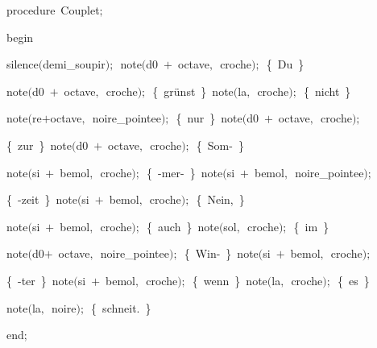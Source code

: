 {\pagebreak[3] 
\vspace{\neglskip}\mbox{\blc  \blk\idt  \mcl procedure\idt \ Couplet$;$}\par 
\vspace{\neglskip}\mbox{\blc  \blk\idt  \mcl begin\idt }\par 
\vspace{\neglskip}\mbox{\blc  \blk\blk\idt  silence$($demi\_soupir$)$$;$\ note$($d0\ $+$\ octave$,$\ croche$)$$;$\ \cmt  \{\ Du\ \}\idt }\par 
\vspace{\neglskip}\mbox{\blc  \blk\blk\idt  note$($d0\ $+$\ octave$,$\ croche$)$$;$\ \cmt  \{\ grünst\ \}\idt \ note$($la$,$\ croche$)$$;$\ \cmt  \{\ nicht\ \}\idt }\par 
\vspace{\neglskip}\mbox{\blc  \blk\blk\idt  note$($re$+$octave$,$\ noire\_pointee$)$$;$\ \cmt  \{\ nur\ \}\idt \ note$($d0\ $+$\ octave$,$\ croche$)$$;$\ }\par 
\vspace{\neglskip}\mbox{\blc  \blk\blk\idt  \cmt  \{\ zur\ \}\idt \ note$($d0\ $+$\ octave$,$\ croche$)$$;$\ \cmt  \{\ Som-\ \}\idt \ }\par 
\vspace{\neglskip}\mbox{\blc  \blk\blk\idt  note$($si\ $+$\ bemol$,$\ croche$)$$;$\ \cmt  \{\ -mer-\ \}\idt \ note$($si\ $+$\ bemol$,$\ noire\_pointee$)$$;$}\par 
\vspace{\neglskip}\mbox{\blc  \blk\blk\idt  \cmt  \{\ -zeit\ \}\idt \ note$($si\ $+$\ bemol$,$\ croche$)$$;$\ \cmt  \{\ Nein,\ \}\idt \ }\par 
\vspace{\neglskip}\mbox{\blc  \blk\blk\idt  note$($si\ $+$\ bemol$,$\ croche$)$$;$\ \cmt  \{\ auch\ \}\idt \ note$($sol$,$\ croche$)$$;$\ \cmt  \{\ im\ \}\idt \ }\par 
\vspace{\neglskip}\mbox{\blc  \blk\blk\idt  note$($d0$+$\ octave$,$\ noire\_pointee$)$$;$\ \cmt  \{\ Win-\ \}\idt \ note$($si\ $+$\ bemol$,$\ croche$)$$;$}\par 
\vspace{\neglskip}\mbox{\blc  \blk\blk\idt  \cmt  \{\ -ter\ \}\idt \ note$($si\ $+$\ bemol$,$\ croche$)$$;$\ \cmt  \{\ wenn\ \}\idt \ note$($la$,$\ croche$)$$;$\ \cmt  \{\ es\ \}\idt }\par 
\vspace{\neglskip}\mbox{\blc  \blk\blk\idt  note$($la$,$\ noire$)$$;$\ \cmt  \{\ schneit.\ \}\idt }\par 
\vspace{\neglskip}\mbox{\blc  \blk\idt  \mcl end\idt $;$}\par 
\medskip

}
